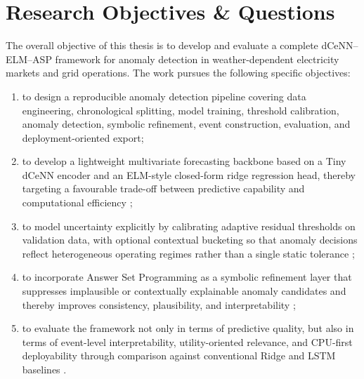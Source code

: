 \section{Research Objectives \& Questions}

The overall objective of this thesis is to develop and evaluate a complete
dCeNN--ELM--ASP framework for anomaly detection in weather-dependent electricity
markets and grid operations. The work pursues the following specific objectives:
\begin{enumerate}
    \item to design a reproducible anomaly detection pipeline covering data engineering, chronological splitting, model training, threshold calibration, anomaly detection, symbolic refinement, event construction, evaluation, and deployment-oriented export;
    \item to develop a lightweight multivariate forecasting backbone based on a Tiny dCeNN encoder and an ELM-style closed-form ridge regression head, thereby targeting a favourable trade-off between predictive capability and computational efficiency \cite{chua1988cellular,huang2006extreme,hoerl1970ridge};
    \item to model uncertainty explicitly by calibrating adaptive residual thresholds on validation data, with optional contextual bucketing so that anomaly decisions reflect heterogeneous operating regimes rather than a single static tolerance \cite{shafer2008tutorial};
    \item to incorporate Answer Set Programming as a symbolic refinement layer that suppresses implausible or contextually explainable anomaly candidates and thereby improves consistency, plausibility, and interpretability \cite{gelfond1988stable,gebser2012answer,gebser2019multi};
    \item to evaluate the framework not only in terms of predictive quality, but also in terms of event-level interpretability, utility-oriented relevance, and CPU-first deployability through comparison against conventional Ridge and LSTM baselines \cite{hoerl1970ridge,hochreiter1997long}.
\end{enumerate}

